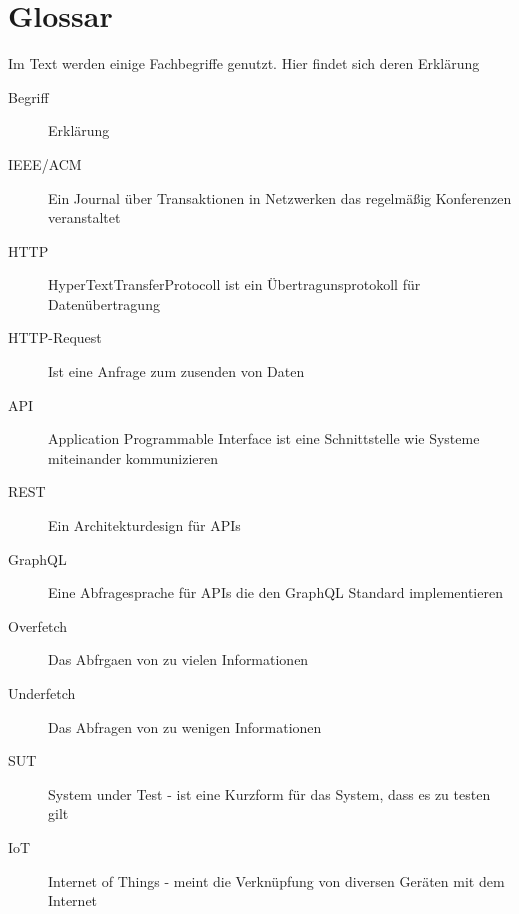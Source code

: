 \chapter{Glossar}

Im Text werden einige Fachbegriffe genutzt. Hier findet sich deren Erklärung

\begin{description}
    \item[Begriff] Erklärung
    \item[IEEE/ACM] Ein Journal über Transaktionen in Netzwerken das regelmäßig Konferenzen veranstaltet
    \item[HTTP] HyperTextTransferProtocoll ist ein Übertragunsprotokoll für Datenübertragung
    \item[HTTP-Request] Ist eine Anfrage zum zusenden von Daten
    \item[API] Application Programmable Interface ist eine Schnittstelle wie Systeme miteinander kommunizieren
    \item[REST] Ein Architekturdesign für APIs
    \item[GraphQL] Eine Abfragesprache für APIs die den GraphQL Standard implementieren
    \item[Overfetch] Das Abfrgaen von zu vielen Informationen
    \item[Underfetch] Das Abfragen von zu wenigen Informationen
    \item[SUT] System under Test - ist eine Kurzform für das System, dass es zu testen gilt
    \item[IoT] Internet of Things - meint die Verknüpfung von diversen Geräten mit dem Internet
\end{description}

